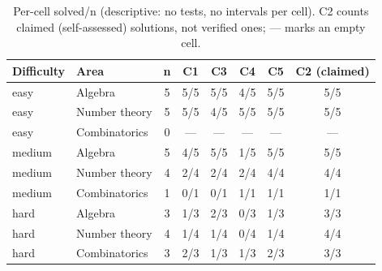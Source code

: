 \begin{table}[t]
\centering
\footnotesize
\setlength{\tabcolsep}{3pt}
\caption{Per-cell solved/n (descriptive: no tests, no intervals per cell). C2 counts claimed (self-assessed) solutions, not verified ones; --- marks an empty cell.}
\label{tab:cells}
\begin{tabular}{llcccccc}
\toprule
Difficulty & Area & n & C1 & C3 & C4 & C5 & C2 (claimed) \\
\midrule
easy & Algebra & 5 & 5/5 & 5/5 & 4/5 & 5/5 & 5/5 \\
easy & Number theory & 5 & 5/5 & 4/5 & 5/5 & 5/5 & 5/5 \\
easy & Combinatorics & 0 & --- & --- & --- & --- & --- \\
medium & Algebra & 5 & 4/5 & 5/5 & 1/5 & 5/5 & 5/5 \\
medium & Number theory & 4 & 2/4 & 2/4 & 2/4 & 4/4 & 4/4 \\
medium & Combinatorics & 1 & 0/1 & 0/1 & 1/1 & 1/1 & 1/1 \\
hard & Algebra & 3 & 1/3 & 2/3 & 0/3 & 1/3 & 3/3 \\
hard & Number theory & 4 & 1/4 & 1/4 & 0/4 & 1/4 & 4/4 \\
hard & Combinatorics & 3 & 2/3 & 1/3 & 1/3 & 2/3 & 3/3 \\
\bottomrule
\end{tabular}
\end{table}

